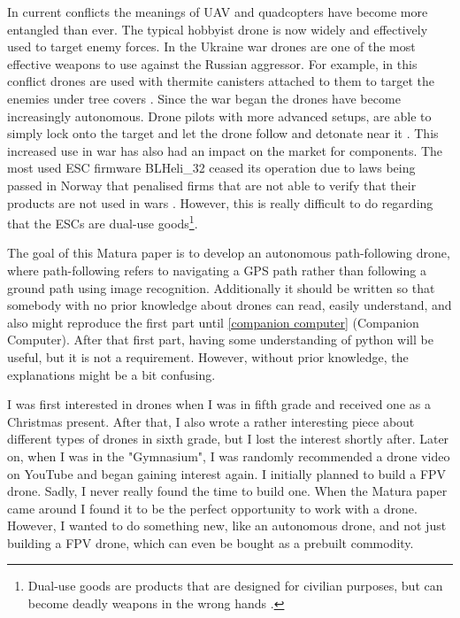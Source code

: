 \documentclass[svgnames]{article}
\begin{document}
	In current conflicts the meanings of \gls{UAV} and quadcopters have become more entangled than ever. The typical hobbyist drone is now widely and effectively used to target enemy forces. In the Ukraine war drones are one of the most effective weapons to use against the Russian aggressor. For example, in this conflict drones are used with thermite canisters attached to them to target the enemies under tree covers \cite{thermitedrones}. Since the war began the drones have become increasingly autonomous. Drone pilots with more advanced setups, are able to simply lock onto the target and let the drone follow and detonate near it \cite{nytimesaidrones}. This increased use in war has also had an impact on the market for components. The most used \gls{ESC} firmware BLHeli\_32 ceased its operation due to laws being passed in Norway that penalised firms that are not able to verify that their products are not used in wars \cite{blhelidead}. However, this is really difficult to do regarding that the \glspl{ESC} are dual-use goods\footnote{Dual-use goods are products that are designed for civilian purposes, but can become deadly weapons in the wrong hands \cite{dualuse}.}.
	
	
	The goal of this Matura paper is to develop an autonomous path-following drone, where path-following refers to navigating a \gls{GPS} path rather than following a ground path using image recognition. Additionally it should be written so that somebody with no prior knowledge about drones can read, easily understand, and also might reproduce the first part until \cref{companion computer} (Companion Computer). After that first part, having some understanding of python will be useful, but it is not a requirement. However, without prior knowledge, the explanations might be a bit confusing.

	I was first interested in drones when I was in fifth grade and received one as a Christmas present. After that, I also wrote a rather interesting piece about different types of drones in sixth grade, but I lost the interest shortly after. Later on, when I was in the "Gymnasium", I was randomly recommended a drone video on YouTube and began gaining interest again. I initially planned to build a \gls{FPV} drone. Sadly, I never really found the time to build one. When the Matura paper came around I found it to be the perfect opportunity to work with a drone. However, I wanted to do something new, like an autonomous drone, and not just building a \gls{FPV} drone, which can even be bought as a prebuilt commodity.
\end{document}
